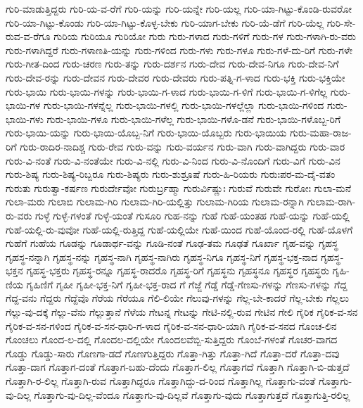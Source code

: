 {ಗುರಿ-ಮಾಡುತ್ತಿದ್ದರು
ಗುರಿ-ಯ-ವ-ರೆಗೆ
ಗುರಿ-ಯನ್ನು
ಗುರಿ-ಯನ್ನೇ
ಗುರಿ-ಯಲ್ಲ
ಗುರಿ-ಯಾ-ಗಿಟ್ಟು-ಕೊಂಡಿ-ರುವರೋ
ಗುರಿ-ಯಾ-ಗಿಟ್ಟು-ಕೊಂಡು
ಗುರಿ-ಯಾ-ಗಿಟ್ಟು-ಕೊಳ್ಳ-ಬೇಕು
ಗುರಿ-ಯಾಗ-ಬೇಕು
ಗುರಿ-ಯೆ-ಡೆಗೆ
ಗುರಿ-ಯೆಲ್ಲ
ಗುರಿ-ಸೇ-ರುವ-ವ-ರೆಗೂ
ಗುರಿಯ
ಗುರಿಯೂ
ಗುರಿಯೋ
ಗುರು
ಗುರು-ಗಳಾದ
ಗುರು-ಗಳಿಗೆ
ಗುರು-ಗಳ
ಗುರು-ಗಳಾಗಿ-ರು-ವರು
ಗುರು-ಗಳಾಗಿದ್ದರೆ
ಗುರು-ಗಳಾಣತಿ-ಯನ್ನು
ಗುರು-ಗಳಿಂದ
ಗುರು-ಗಳು
ಗುರು-ಗಳೂ
ಗುರು-ಗಳೆ-ದು-ರಿಗೆ
ಗುರು-ಗಳೇ
ಗುರು-ಗೀತ-ದಿಂದ
ಗುರು-ಚರಣ
ಗುರು-ತನ್ನು
ಗುರು-ದರ್ಶನ
ಗುರು-ದೇವ
ಗುರು-ದೇವ-ನಿಗೂ
ಗುರು-ದೇವ-ನಿಗೆ
ಗುರು-ದೇವ-ರನ್ನು
ಗುರು-ದೇವನ
ಗುರು-ದೇವರ
ಗುರು-ದೇವರು
ಗುರು-ಪತ್ನಿ-ಗ-ಳಾದ
ಗುರು-ಭಕ್ತಿ
ಗುರು-ಭಕ್ತಿಯೇ
ಗುರು-ಭಾಯಿ
ಗುರು-ಭಾಯಿ-ಗಳನ್ನು
ಗುರು-ಭಾಯಿ-ಗ-ಳಾದ
ಗುರು-ಭಾಯಿ-ಗ-ಳಿಗೆ
ಗುರು-ಭಾಯಿ-ಗ-ಳಿಗೆಲ್ಲ
ಗುರು-ಭಾಯಿ-ಗಳ
ಗುರು-ಭಾಯಿ-ಗಳನ್ನೆಲ್ಲ
ಗುರು-ಭಾಯಿ-ಗಳಲ್ಲಿ
ಗುರು-ಭಾಯಿ-ಗಳಲ್ಲೆಲ್ಲಾ
ಗುರು-ಭಾಯಿ-ಗಳಿಂದ
ಗುರು-ಭಾಯಿ-ಗಳು
ಗುರು-ಭಾಯಿ-ಗಳೂ
ಗುರು-ಭಾಯಿ-ಗಳೆಲ್ಲ
ಗುರು-ಭಾಯಿ-ಗಳೊ-ಡನೆ
ಗುರು-ಭಾಯಿ-ಗಳೊಬ್ಬ-ರಿಗೆ
ಗುರು-ಭಾಯಿ-ಯನ್ನು
ಗುರು-ಭಾಯಿ-ಯೊಬ್ಬ-ನಿಗೆ
ಗುರು-ಭಾಯಿ-ಯೊಬ್ಬರು
ಗುರು-ಭಾಯಿಯ
ಗುರು-ಮಹಾ-ರಾಜ-ರಿಗೆ
ಗುರು-ರಾದಿರ-ನಾದಿಶ್ಚ
ಗುರು-ರೇವ
ಗುರು-ವನ್ನು
ಗುರು-ವರ್ಯನ
ಗುರು-ವಾಗಿ
ಗುರು-ವಾಗಿದ್ದರು
ಗುರು-ವಾರ
ಗುರು-ವಿ-ನಂತೆ
ಗುರು-ವಿ-ನಂತೆಯೇ
ಗುರು-ವಿ-ನಲ್ಲಿ
ಗುರು-ವಿ-ನಿಂದ
ಗುರು-ವಿ-ನೊಂದಿಗೆ
ಗುರು-ವಿಗೆ
ಗುರು-ವಿನ
ಗುರು-ಶಿಷ್ಯ
ಗುರು-ಶಿಷ್ಯ-ರಿಬ್ಬರೂ
ಗುರು-ಶಿಷ್ಯರು
ಗುರು-ಶುಶ್ರೂಷೆ
ಗುರು-ಹಿ-ರಿಯರು
ಗುರುಃಪರ-ಮ-ದೈ-ವತಂ
ಗುರುತು
ಗುರುತ್ವಾ-ಕರ್ಷಣ
ಗುರುರ್ದೇವೋ
ಗುರುರ್ಬ್ರಹ್ಮಾ
ಗುರುರ್ವಿಷ್ಣುಃ
ಗುರುವೆ
ಗುರುವೇ
ಗುರೋಃ
ಗುಲಾ-ಮನೆ
ಗುಲಾ-ಮರು
ಗುಲಾಬಿ
ಗುಲಾಮ-ಗಿರಿ
ಗುಲಾಮ-ಗಿರಿ-ಯಲ್ಲಿತ್ತು
ಗುಲಾಮ-ಗಿರಿಯ
ಗುಲಾಮ-ರನ್ನಾಗಿ
ಗುಲಾಮ-ರಾಗಿ-ರು-ವರು
ಗುಳ್ಳೆ
ಗುಳ್ಳೆ-ಗಳಂತೆ
ಗುಳ್ಳೆ-ಯಂತೆ
ಗುಸೂರಿ
ಗುಹ-ನನ್ನು
ಗುಹೆ
ಗುಹೆ-ಯಂತಹ
ಗುಹೆ-ಯನ್ನು
ಗುಹೆ-ಯಲ್ಲಿ
ಗುಹೆ-ಯಲ್ಲಿ-ರು-ವುವೋ
ಗುಹೆ-ಯಲ್ಲಿ-ರುತ್ತಿದ್ದ
ಗುಹೆ-ಯಲ್ಲಿಯೇ
ಗುಹೆ-ಯಿಂದ
ಗುಹೆ-ಯೊಂದ-ರಲ್ಲಿ
ಗುಹೆ-ಯೊಳಗೆ
ಗುಹೆಗೆ
ಗುಹೆಯ
ಗೂಡನ್ನು
ಗೂಡಾರ್ಥ-ವನ್ನು
ಗೂಡಿ-ನಂತೆ
ಗೂಢ-ತಮ
ಗೂಢತೆ
ಗೂರ್ಖಾ
ಗೃಹ-ವನ್ನು
ಗೃಹಸ್ಥ
ಗೃಹಸ್ಥ-ನನ್ನಾಗಿ
ಗೃಹಸ್ಥ-ನನ್ನು
ಗೃಹಸ್ಥ-ನಾಗಿ
ಗೃಹಸ್ಥ-ನಾಗಿರು
ಗೃಹಸ್ಥ-ನಿಗೂ
ಗೃಹಸ್ಥ-ನಿಗೆ
ಗೃಹಸ್ಥ-ಭಕ್ತ-ನಾದ
ಗೃಹಸ್ಥ-ಭಕ್ತನ
ಗೃಹಸ್ಥ-ಭಕ್ತರು
ಗೃಹಸ್ಥ-ರನ್ನೂ
ಗೃಹಸ್ಥ-ರಾದರೊ
ಗೃಹಸ್ಥ-ರಿಗೆ
ಗೃಹಸ್ಥನು
ಗೃಹಸ್ಥನೂ
ಗೃಹಸ್ಥರ
ಗೃಹಸ್ಥರು
ಗೃಹಿ-ಣಿಯ
ಗೃಹಿಣಿಗೆ
ಗೃಹೀ
ಗೃಹೀ-ಭಕ್ತ-ನಿಗೆ
ಗೃಹೀ-ಭಕ್ತ-ರಾದ
ಗೆ
ಗೆಜ್ಜೆ
ಗೆಡ್ಡೆ
ಗೆಡ್ಡೆ-ಗೆಣಸು-ಗಳನ್ನು
ಗೆಣಸು-ಗಳನ್ನು
ಗೆದ್ದ
ಗೆದ್ದ-ವನು
ಗೆದ್ದರು
ಗೆದ್ದೆವೊ
ಗೆರೆಯ
ಗೆರೆಯೂ
ಗೆಲಿ-ಲಿಯೇ
ಗೆಲುವು-ಗಳನ್ನು
ಗೆಲ್ಲ-ಬೇ-ಕಾದರೆ
ಗೆಲ್ಲ-ಬೇಕು
ಗೆಲ್ಲಲು
ಗೆಲ್ಲು-ವು-ದಕ್ಕೆ
ಗೆಲ್ಲು-ವೆನು
ಗೆಲ್ಲುತ್ತಾನೆ
ಗೆಳೆಯ
ಗೇಟನ್ನ
ಗೇಟನ್ನು
ಗೇಟಿ-ನಲ್ಲಿ-ರುವ
ಗೇಟಿನ
ಗೇಲಿ
ಗೈರಿಕ
ಗೈರಿಕ-ವ-ಸನ
ಗೈರಿಕ-ವ-ಸನ-ಗಳಿಂದ
ಗೈರಿಕ-ವ-ಸನ-ಧಾರಿ-ಗ-ಳಾದ
ಗೈರಿಕ-ವ-ಸನ-ಧಾರಿ-ಯಾಗಿ
ಗೈರಿಕ-ವ-ಸನದ
ಗೊಂಚ-ಲಿನ
ಗೊಂಚಲು
ಗೊಂದ-ಲ-ದಲ್ಲಿ
ಗೊಂದಲ-ದಲ್ಲಿಯೇ
ಗೊಂದಲವೆಬ್ಬಿ-ಸುತ್ತಿದ್ದರು
ಗೊಂಬೆ-ಗಳಂತೆ
ಗೊಚರ-ವಾಗದ
ಗೊಡ್ಡು
ಗೊಡ್ಡು-ಸಾರು
ಗೊಣಗಾ-ಡದೆ
ಗೊಣಗುತ್ತಿದ್ದರು
ಗೊತ್ತಾ-ಗಿತ್ತು
ಗೊತ್ತಾ-ಗಿದೆ
ಗೊತ್ತಾ-ದರೆ
ಗೊತ್ತಾ-ದವು
ಗೊತ್ತಾ-ದಾಗ
ಗೊತ್ತಾಗ-ದಂತೆ
ಗೊತ್ತಾಗ-ಬಹು-ದೆಂದು
ಗೊತ್ತಾಗ-ಲಿಲ್ಲ
ಗೊತ್ತಾಗದೆ
ಗೊತ್ತಾಗಿ
ಗೊತ್ತಾಗಿ-ಬಿ-ಡುತ್ತದೆ
ಗೊತ್ತಾಗಿ-ರ-ಲಿಲ್ಲ
ಗೊತ್ತಾಗಿ-ರುವ
ಗೊತ್ತಾಗಿದ್ದರೂ
ಗೊತ್ತಾಗಿದ್ದು-ದ-ರಿಂದ
ಗೊತ್ತಾಗಿಲ್ಲ
ಗೊತ್ತಾಗು-ವಂತೆ
ಗೊತ್ತಾಗು-ವು-ದಿಲ್ಲ
ಗೊತ್ತಾಗು-ವು-ದಿಲ್ಲ-ವೆಂದೂ
ಗೊತ್ತಾಗು-ವು-ದಿಲ್ಲವೆ
ಗೊತ್ತಾಗು-ವುದು
ಗೊತ್ತಾಗುತ್ತದೆ
ಗೊತ್ತಾಗುತ್ತಿ-ರಲಿಲ್ಲ
}
